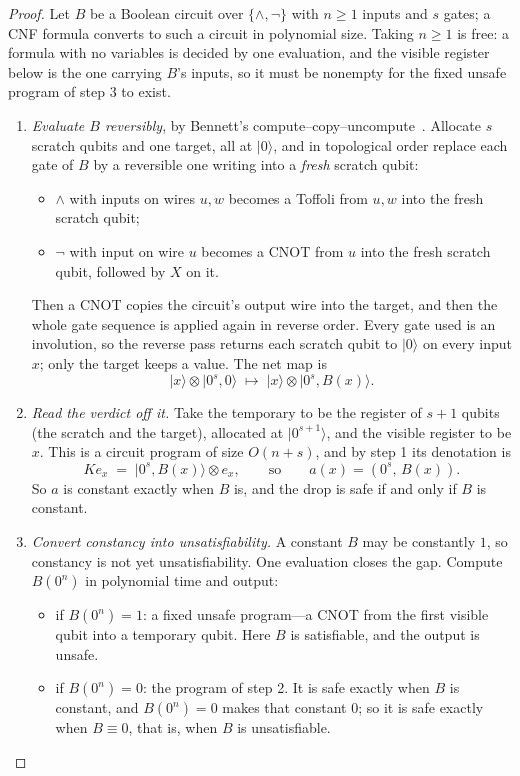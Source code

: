 \documentclass[acmsmall,screen,review,anonymous,nonacm]{acmart}
\begin{document}
\begin{proof}
Let $B$ be a Boolean circuit over $\{\wedge, \neg\}$ with $n \ge 1$ inputs and
$s$ gates; a CNF formula converts to such a circuit in polynomial size. Taking
$n \ge 1$ is free: a formula with no variables is decided by one evaluation,
and the visible register below is the one carrying $B$'s inputs, so it must be
nonempty for the fixed unsafe program of step 3 to exist.

\begin{enumerate}
\item \emph{Evaluate $B$ reversibly}, by Bennett's
  compute--copy--uncompute~\cite{Bennett1973Logical}. Allocate $s$ scratch
  qubits and one target, all at $|0\rangle$, and in topological order replace
  each gate of $B$ by a reversible one writing into a \emph{fresh} scratch
  qubit:
  \begin{itemize}
  \item $\wedge$ with inputs on wires $u, w$ becomes a Toffoli from $u, w$
    into the fresh scratch qubit;
  \item $\neg$ with input on wire $u$ becomes a CNOT from $u$ into the fresh
    scratch qubit, followed by $X$ on it.
  \end{itemize}
  Then a CNOT copies the circuit's output wire into the target, and then the
  whole gate sequence is applied again in reverse order. Every gate used is an
  involution, so the reverse pass returns each scratch qubit to $|0\rangle$ on
  every input $x$; only the target keeps a value. The net map is
  \[
    |x\rangle \otimes |0^{s}, 0\rangle \;\longmapsto\;
    |x\rangle \otimes |0^{s}, B(x)\rangle .
  \]

\item \emph{Read the verdict off it.} Take the temporary to be the register of
  $s+1$ qubits (the scratch and the target), allocated at $|0^{s+1}\rangle$,
  and the visible register to be $x$. This is a circuit program of size
  $O(n+s)$, and by step 1 its denotation is
  \[
    K e_x \;=\; |0^{s}, B(x)\rangle \otimes e_x ,
    \qquad\text{so}\qquad a(x) = (0^{s},\,B(x)) .
  \]
  So $a$ is constant exactly when $B$ is, and the drop is safe if and only if
  $B$ is constant.

\item \emph{Convert constancy into unsatisfiability.} A constant $B$ may be
  constantly $1$, so constancy is not yet unsatisfiability. One evaluation
  closes the gap. Compute $B(0^{n})$ in polynomial time and output:
  \begin{itemize}
  \item if $B(0^{n}) = 1$: a fixed unsafe program---a CNOT from the first
    visible qubit into a temporary qubit. Here $B$ is satisfiable, and the
    output is unsafe.
  \item if $B(0^{n}) = 0$: the program of step 2. It is safe exactly when $B$
    is constant, and $B(0^{n}) = 0$ makes that constant $0$; so it is safe
    exactly when $B \equiv 0$, that is, when $B$ is unsatisfiable.
  \end{itemize}
\end{enumerate}


\end{proof}
\end{document}
